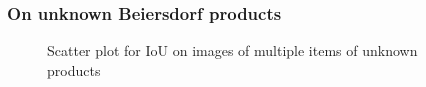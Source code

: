 \subsubsection{On unknown Beiersdorf products}\label{subsec:resunknownprod}
\begin{figure}[h]
    \centering
    \hfill
    \caption{Scatter plot for IoU on images of multiple items of unknown products}
    \label{figure: unknownproducts}
\end{figure}

